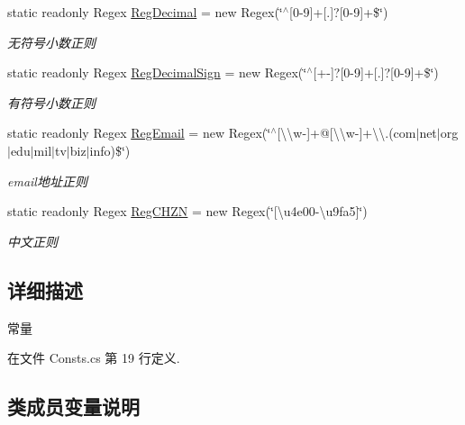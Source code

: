 \begin{DoxyCompactItemize}
static readonly Regex \hyperlink{class_x_c_l_net_tools_1_1_common_1_1_consts_ac0f265f5bb166031147b7461b3d3a34d}{Reg\+Decimal} = new Regex(\char`\"{}$^\wedge$\mbox{[}0-\/9\mbox{]}+\mbox{[}.\mbox{]}?\mbox{[}0-\/9\mbox{]}+\$\char`\"{})
\begin{DoxyCompactList}\small\item\em 无符号小数正则 \end{DoxyCompactList}\item 
static readonly Regex \hyperlink{class_x_c_l_net_tools_1_1_common_1_1_consts_a9da5daa9a2a5096f2ff7a2047b3fa966}{Reg\+Decimal\+Sign} = new Regex(\char`\"{}$^\wedge$\mbox{[}+-\/\mbox{]}?\mbox{[}0-\/9\mbox{]}+\mbox{[}.\mbox{]}?\mbox{[}0-\/9\mbox{]}+\$\char`\"{})
\begin{DoxyCompactList}\small\item\em 有符号小数正则 \end{DoxyCompactList}\item 
static readonly Regex \hyperlink{class_x_c_l_net_tools_1_1_common_1_1_consts_acbce80d18301625092bfc43fa737aab0}{Reg\+Email} = new Regex(\char`\"{}$^\wedge$\mbox{[}\textbackslash{}\textbackslash{}w-\/\mbox{]}+@\mbox{[}\textbackslash{}\textbackslash{}w-\/\mbox{]}+\textbackslash{}\textbackslash{}.(com$\vert$net$\vert$org$\vert$edu$\vert$mil$\vert$tv$\vert$biz$\vert$info)\$\char`\"{})
\begin{DoxyCompactList}\small\item\em email地址正则 \end{DoxyCompactList}\item 
static readonly Regex \hyperlink{class_x_c_l_net_tools_1_1_common_1_1_consts_a61c470d5a13f82525d45ac6e4c42a147}{Reg\+C\+H\+ZN} = new Regex(\char`\"{}\mbox{[}\textbackslash{}u4e00-\/\textbackslash{}u9fa5\mbox{]}\char`\"{})
\begin{DoxyCompactList}\small\item\em 中文正则 \end{DoxyCompactList}\end{DoxyCompactItemize}


\subsection{详细描述}
常量 



在文件 Consts.\+cs 第 19 行定义.



\subsection{类成员变量说明}
\mbox{\label{class_x_c_l_net_tools_1_1_common_1_1_consts_a61c470d5a13f82525d45ac6e4c42a147}} 
